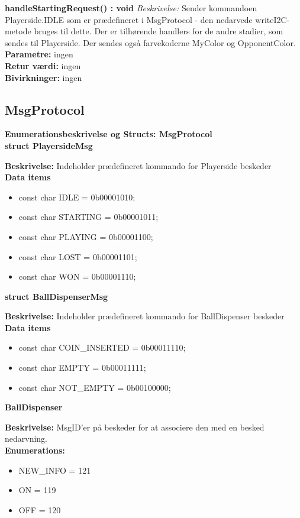 \documentclass[Softwaredesign/Softwaredesign_main.tex]{subfiles}
\begin{document}
\textbf{handleStartingRequest() : void}
\textit{Beskrivelse:} Sender kommandoen Playerside.IDLE som er prædefineret i MsgProtocol - den nedarvede writeI2C-metode bruges til dette. Der er tilhørende handlers for de andre stadier, som sendes til Playerside. Der sendes også farvekoderne MyColor og OpponentColor. \\[0.2cm]
\textbf{Parametre:} ingen \\[0.2cm]
\textbf{Retur værdi:} ingen \\[0.2cm]
\textbf{Bivirkninger:} ingen \\[0.2cm]

\subsection{MsgProtocol}
{\large\textbf{Enumerationsbeskrivelse og Structs: MsgProtocol}}\\[0.2cm]

\textbf{struct PlayersideMsg}
\begin{adjustwidth}{1cm}{0pt}
\textbf{Beskrivelse:} Indeholder prædefineret kommando for Playerside beskeder \\[0.2cm]
\textbf{Data items}
\begin{itemize}
    \item const char IDLE = 0b00001010;
    \item const char STARTING = 0b00001011;
    \item const char PLAYING = 0b00001100;
    \item const char LOST = 0b00001101;
    \item const char WON = 0b00001110;
\end{itemize}
\end{adjustwidth}

\textbf{struct BallDispenserMsg}
\begin{adjustwidth}{1cm}{0pt}
\textbf{Beskrivelse:} Indeholder prædefineret kommando for BallDispenser beskeder \\[0.2cm]
\textbf{Data items}
\begin{itemize}
    \item const char COIN\_INSERTED = 0b00011110;
    \item const char EMPTY = 0b00011111;
    \item const char NOT\_EMPTY = 0b00100000;
\end{itemize}
\end{adjustwidth}

\textbf{BallDispenser}
\begin{adjustwidth}{1cm}{0pt}
\textbf{Beskrivelse:} MsgID'er på beskeder for at associere den med en besked nedarvning. \\[0.2cm]
\textbf{Enumerations:}
\begin{itemize}
    \item NEW\_INFO = 121
    \item ON = 119
    \item OFF = 120
\end{itemize}
\end{adjustwidth}
\end{document}
